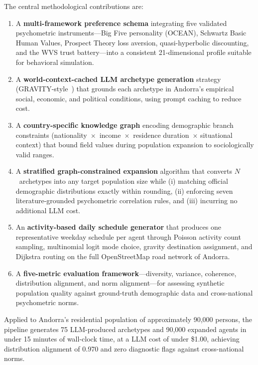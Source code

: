 \documentclass[sustainability,article,submit,pdftex,moreauthors]{Definitions/mdpi}
\begin{document}
The central methodological contributions are:

\begin{enumerate}
\item A \textbf{multi-framework preference schema} integrating five validated
      psychometric instruments---Big Five personality (OCEAN), Schwartz Basic
      Human Values, Prospect Theory loss aversion, quasi-hyperbolic discounting,
      and the WVS trust battery---into a consistent 21-dimensional profile
      suitable for behavioral simulation.
\item A \textbf{world-context-cached LLM archetype generation} strategy
      (GRAVITY-style~\cite{gravity2025}) that grounds each archetype in
      Andorra's empirical social, economic, and political conditions, using
      prompt caching to reduce cost.
\item A \textbf{country-specific knowledge graph} encoding demographic branch
      constraints (nationality~$\times$~income~$\times$~residence duration~$\times$
      situational context) that bound field values during population expansion
      to sociologically valid ranges.
\item A \textbf{stratified graph-constrained expansion} algorithm that converts
      $N$~archetypes into any target population size while (i) matching official
      demographic distributions exactly within rounding, (ii) enforcing seven
      literature-grounded psychometric correlation rules, and (iii) incurring
      no additional LLM cost.
\item An \textbf{activity-based daily schedule generator} that produces one
      representative weekday schedule per agent through Poisson activity count
      sampling, multinomial logit mode choice, gravity destination assignment,
      and Dijkstra routing on the full OpenStreetMap road network of Andorra.
\item A \textbf{five-metric evaluation framework}---diversity, variance,
      coherence, distribution alignment, and norm alignment---for assessing
      synthetic population quality against ground-truth demographic data and
      cross-national psychometric norms.
\end{enumerate}

Applied to Andorra's residential population of approximately 90,000 persons,
the pipeline generates 75 LLM-produced archetypes and 90,000 expanded agents
in under 15 minutes of wall-clock time, at a LLM cost of under \$1.00, achieving
distribution alignment of 0.970 and zero diagnostic flags against cross-national
norms.
\end{document}
